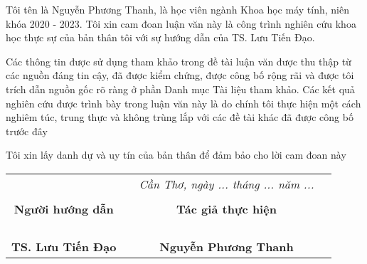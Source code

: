\documentclass[./thesis.tex]{subfiles}
\begin{document}
{\fontsize{13}{12} \selectfont
\quad Tôi tên là Nguyễn Phương Thanh, là học viên ngành Khoa học máy tính, niên khóa 2020 - 2023. Tôi xin cam đoan luận văn này là công trình nghiên cứu khoa học thực sự của bản thân tôi với sự hướng dẫn của TS. Lưu Tiến Đạo.

}

\bigskip

{\fontsize{13}{12} \selectfont
Các thông tin được sử dụng tham khảo trong đề tài luận 
văn được thu thập từ các nguồn đáng tin cậy, đã được 
kiểm chứng, được công bố rộng rãi và được tôi trích dẫn nguồn 
gốc rõ ràng ở phần Danh mục Tài liệu tham khảo. Các kết quả 
nghiên cứu được trình bày trong luận văn này là do chính 
tôi thực hiện một cách nghiêm túc, trung thực và không trùng lắp 
với các đề tài khác đã được công bố trước đây

}

\bigskip
{\fontsize{13}{12} \selectfont
    Tôi xin lấy danh dự và uy tín của bản thân để đảm bảo cho 
lời cam đoan này
}
{\fontsize{13}{12} \selectfont


\hspace*{\fill}
\begin{table}[h!]
    \centering
    \begin{tabularx}{\columnwidth}{cXcc}
    
    & & \textit{Cần Thơ, ngày ... tháng ... năm ... }&\\ 
    \\ 
    \textbf{Người hướng dẫn} & & \centering \textbf{Tác giả thực hiện}&\\ 
    \\ 
    \\
    \\
    \\\centering \textbf{TS. Lưu Tiến Đạo} & &\centering \textbf{Nguyễn Phương Thanh}
    \end{tabularx}
    \end{table}


}
\end{document}

